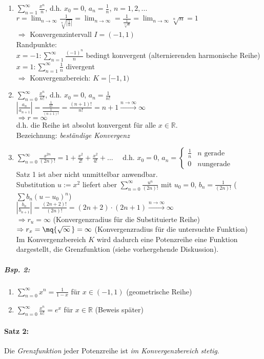 \begin{enumerate}[label=\alph*.)]
\item $\sum_{n=1}^\infty \frac{x^n}{n}$, d.h. $x_0=0$, $a_n=\frac{1}{n}$, $n=1,2,...$\\
$r= \lim_{n\to\infty} \frac{1}{\sqrt[n]{\left|\frac{1}{n}\right|}}=\lim_{n\to \infty}=\frac{1}{\frac{1}{\sqrt[n]{n}}}=\lim_{n\to\infty}\sqrt[n]{n}=1$\\
$\Rightarrow$ Konvergenzintervall $I=(-1,1)$\\
Randpunkte:\\
$x=-1: \sum_{n=1}^\infty \frac{(-1)^n}{n}$ bedingt konvergent (alternierenden harmonische Reihe)\\
$x=1: \sum_{n=1}^\infty \frac{1}{n}$ divergent\\
$\Rightarrow$ Konvergenzbereich: $K=[-1,1)$
\item $\sum_{n=0}^\infty \frac{x^n}{n!}$, d.h. $x_0=0$, $a_n=\frac{1}{n!}$\\
$\left| \frac{a_n}{a_{n+1}}\right| = \frac{\frac{1}{n!}}{\frac{1}{(n+1)!}}=\frac{(n+1)!}{n!}=n+1\overset{n\to \infty}{\longrightarrow} \infty$\\
$\Rightarrow r = \infty$\\
d.h. die Reihe ist absolut konvergent für alle $x \in \mathbb{R}$.\\
Bezeichnung: \emph{beständige Konvergenz}
\item $\sum_{n=0}^\infty \frac{x^{2n}}{(2n)!}=1+\frac{x^2}{2!}+\frac{x^2}{4!}+...\quad$ d.h. $x_0 = 0$, $a_n=\begin{cases}
\frac{1}{n} & n \text{ gerade}\\
0 & n \text{ungerade}
\end{cases}$\\
Satz 1 ist aber nicht unmittelbar anwendbar.\\
Substitution $u:=x^2$ liefert aber $\sum_{n=0}^\infty \frac{u^n}{(2n)!}$ mit $u_0=0$, $b_n=\frac{1}{(2n)!}$ ($\sum b_n (u-u_0)^n$)\\
$\left| \frac{b_n}{b_{n+1}}\right|=\frac{(2n+2)!}{(2n)!}=(2n+2)\cdot (2n+1) \overset{n\to \infty}{\longrightarrow} \infty$\\
$\Rightarrow r_u=\infty$ (Konvergenzradius für die Substituierte Reihe)\\
$\Rightarrow r_x=\mq{\sqrt{\infty}\,}= \infty$ (Konvergenzradius für die untersuchte Funktion)\\
Im Konvergenzbereich $K$ wird dadurch eine Potenzreihe eine Funktion dargestellt, die Grenzfunktion (siehe vorhergehende Diskussion).
\end{enumerate}
\subparagraph{Bsp. 2:}
\begin{enumerate}[label=\alph*.)]
\item $\sum_{n=0}^\infty x^n = \frac{1}{1-x}$ für $x\in (-1,1)$ (geometrische Reihe)
\item $\sum_{n=0}^\infty \frac{x^n}{n!}=e^x$ für $x\in \mathbb{R}$ (Beweis später)
\end{enumerate}
\paragraph{Satz 2:} Die \emph{Grenzfunktion} jeder Potenzreihe ist \emph{im Konvergenzbereich stetig}.